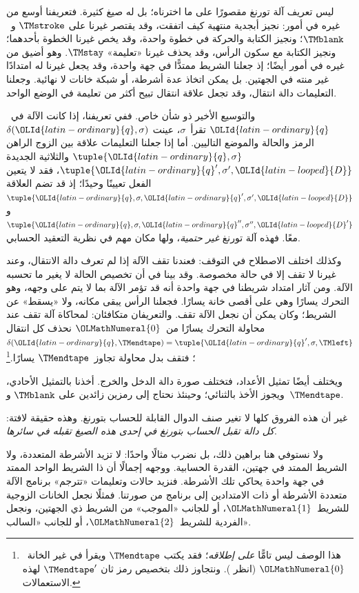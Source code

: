 \documentclass[../../../include/open-logic-section]{subfiles}
\begin{document}

ليس تعريف آلة تورنغ مقصورًا على ما اخترناه؛ بل له صيغ كثيرة. فتعريفنا أوسع من غيره في أمور: نجيز أبجدية منتهية كيف اتفقت، وقد يقتصر غيرنا على $\TMstroke$ و~$\TMblank$؛ ونجيز الكتابة والحركة في خطوة واحدة، وقد يخص غيرنا الخطوة بأحدهما؛ ونجيز الكتابة مع سكون الرأس، وقد يحذف غيرنا «تعليمة» $\TMstay$. وهو أضيق من غيره في أمور أيضًا؛ إذ جعلنا الشريط ممتدًّا في جهة واحدة، وقد يجعل غيرنا له امتدادًا غير منته في الجهتين. بل يمكن اتخاذ عدة أشرطة، أو شبكة خانات لا نهائية. وجعلنا التعليمات دالة انتقال، وقد تجعل علاقة انتقال تبيح أكثر من تعليمة في الوضع الواحد.

والتوسيع الأخير ذو شأن خاص. ففي تعريفنا، إذا كانت الآلة في~${\OLId{latin-ordinary}{q}}$ تقرأ~$\sigma$، عينت $\delta({\OLId{latin-ordinary}{q}},\sigma)$ الرمز والحالة والموضع التاليين. أما إذا جعلنا التعليمات علاقة بين الزوج الراهن $\tuple{{\OLId{latin-ordinary}{q}},\sigma}$ والثلاثية الجديدة $\tuple{{\OLId{latin-ordinary}{q}}',\sigma',{\OLId{latin-looped}{D}}}$، فقد لا يتعين الفعل تعيينًا وحيدًا؛ إذ قد تضم العلاقة $\tuple{{\OLId{latin-ordinary}{q}},\sigma,{\OLId{latin-ordinary}{q}}',\sigma',{\OLId{latin-looped}{D}}}$ و$\tuple{{\OLId{latin-ordinary}{q}},\sigma,{\OLId{latin-ordinary}{q}}'',\sigma'',{\OLId{latin-looped}{D}}'}$ معًا. فهذه آلة تورنغ \emph{غير حتمية}، ولها مكان مهم في نظرية التعقيد الحسابي.

وكذلك اختلف الاصطلاح في التوقف: فعندنا تقف الآلة إذا لم تعرف دالة الانتقال، وعند غيرنا لا تقف إلا في حالة مخصوصة. وقد بينا في  أن تخصيص الحالة لا يغير ما تحسبه الآلة. ومن آثار امتداد شريطنا في جهة واحدة أنه قد تؤمر الآلة بما لا يتم على وجهه، وهو التحرك يسارًا وهي على أقصى خانة يسارًا. فجعلنا الرأس يبقى مكانه، ولا «يسقط» عن الشريط؛ وكان يمكن أن نجعل الآلة تقف. والتعريفان متكافئان: لمحاكاة آلة تقف عند محاولة التحرك يسارًا من~${\OLMathNumeral{0}}$ نحذف كل انتقال $\delta({\OLId{latin-ordinary}{q}},\TMendtape)=\tuple{{\OLId{latin-ordinary}{q}}',\sigma,\TMleft}$؛ فتقف بدل محاولة تجاوز~$\TMendtape$ يسارًا.\footnote{هذا الوصف ليس تامًّا \emph{على إطلاقه}؛ فقد يكتب $\TMendtape$ ويقرأ في غير الخانة~${\OLMathNumeral{0}}$ (انظر ). ونتجاوز ذلك بتخصيص رمز ثان $\TMendtape'$ لهذه الاستعمالات.}

ويختلف أيضًا تمثيل الأعداد، فتختلف صورة دالة الدخل والخرج. أخذنا بالتمثيل الأحادي، ويجوز الأخذ بالثنائي؛ وحينئذ نحتاج إلى رمزين زائدين على $\TMblank$ و~$\TMendtape$.

غير أن هذه الفروق كلها لا تغير صنف الدوال القابلة للحساب بتورنغ. وهذه حقيقة لافتة: \emph{كل دالة تقبل الحساب بتورنغ في إحدى هذه الصيغ تقبله في سائرها}.

ولا نستوفي هنا براهين ذلك، بل نضرب مثالًا واحدًا: لا تزيد الأشرطة المتعددة، ولا الشريط الممتد في جهتين، القدرة الحسابية. ووجهه إجمالًا أن ذا الشريط الواحد الممتد في جهة واحدة يحاكي تلك الأشرطة. فنزيد حالات وتعليمات «تترجم» برنامج الآلة متعددة الأشرطة أو ذات الامتدادين إلى برنامج من صورتنا. فمثلًا نجعل الخانات الزوجية للشريط~${\OLMathNumeral{1}}$، أو للجانب «الموجب» من الشريط ذي الجهتين، ونجعل الفردية للشريط~${\OLMathNumeral{2}}$، أو للجانب «السالب».
\end{document}
